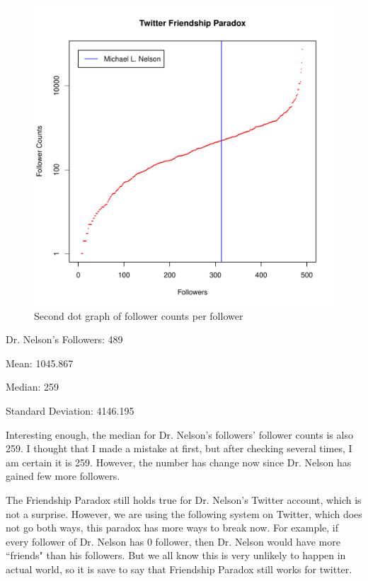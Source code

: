 \documentclass[12pt]{article}
\begin{document}
\begin{figure}[h]
\centering
\includegraphics[width=5in]{TwitterFollowerslg.pdf}
\caption{Second dot graph of follower counts per follower}
\end{figure}

\noindent
Dr. Nelson's Followers: 489

\noindent
Mean: 1045.867

\noindent
Median: 259

\noindent
Standard Deviation: 4146.195

Interesting enough, the median for Dr. Nelson's followers' follower counts is also 259. I thought that I made a mistake at first, but after checking several times, I am certain it is 259. However, the number has change now since Dr. Nelson has gained few more followers. 

The Friendship Paradox still holds true for Dr. Nelson's Twitter account, which is not a surprise. However, we are using the following system on Twitter, which does not go both ways, this paradox has more ways to break now. For example, if every follower of Dr. Nelson has 0 follower, then Dr. Nelson would have more ``friends" than his followers. But we all know this is very unlikely to happen in actual world, so it is save to say that Friendship Paradox still works for twitter.
\end{document}

